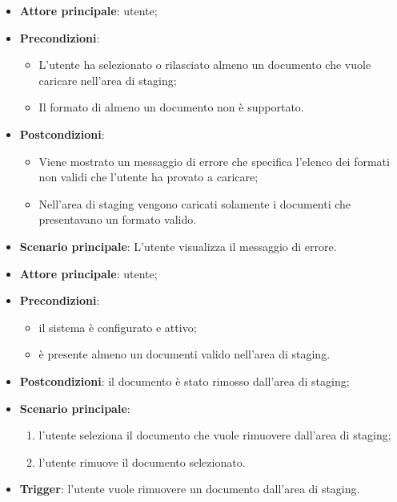 \documentclass[10pt, a4paper]{article}
\begin{document}
    \begin{itemize}
        \item \textbf{Attore principale}: utente;
        \item \textbf{Precondizioni}:
            \begin{itemize}
                \item L’utente ha selezionato o rilasciato almeno un documento che vuole caricare nell’area di staging;
                \item Il formato di almeno un documento non è supportato.
            \end{itemize}
        \item \textbf{Postcondizioni}:
            \begin{itemize}
                \item Viene mostrato un messaggio di errore che specifica l'elenco dei formati non validi che l'utente ha provato a caricare;
                \item Nell’area di staging vengono caricati solamente i documenti che presentavano un formato valido.
            \end{itemize}
        \item \textbf{Scenario principale}: L’utente visualizza il messaggio di errore.
    \end{itemize}

    \begin{itemize}
        \item \textbf{Attore principale}: utente;
        \item \textbf{Precondizioni}:
            \begin{itemize}
                \item il sistema è configurato e attivo;
                \item è presente almeno un documenti valido nell’area di staging.
            \end{itemize}
        \item \textbf{Postcondizioni}: il documento è stato rimosso dall’area di staging;
        \item \textbf{Scenario principale}: 
            \begin{enumerate}
                \item l’utente seleziona il documento che vuole rimuovere dall’area di staging;
                \item l’utente rimuove il documento selezionato.
            \end{enumerate}
        \item \textbf{Trigger}: l’utente vuole rimuovere un documento dall’area di staging.
    \end{itemize}
\end{document}
